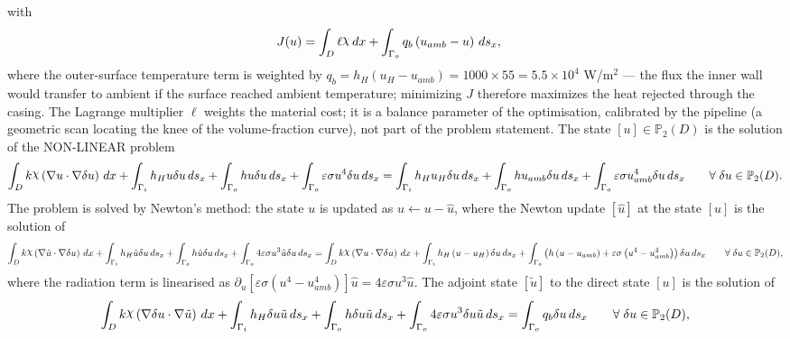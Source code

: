 \documentclass[preview]{standalone}
\let\oldcdot\cdot
\let\cdot\oldcdot
\begin{document}
with
\begin{align*}
J(u) &=  \int_{D} \ell \raisebox{\depth}{$\chi$} \,dx + \int_{\Gamma_o} q_b \left( u_{amb} - u\right) \,ds_x ,
 \end{align*}
where the outer-surface temperature term is weighted by $q_b = h_H \left( u_H - u_{amb}\right) = 1000 \times 55 = 5.5 \times 10^{4}$ W/m$^{2}$ — the flux the inner wall would transfer to ambient if the surface reached ambient temperature; minimizing $J$ therefore maximizes the heat rejected through the casing.  The Lagrange multiplier $\ell$ weights the material cost; it is a balance parameter of the optimisation, calibrated by the pipeline (a geometric scan locating the knee of the volume-fraction curve), not part of the problem statement.
The state $\left[ u\right] \in \mathbb P_{2}(D)$ is the solution of the NON-LINEAR problem
\begin{dmath*}
\int_{D} k \raisebox{\depth}{$\chi$} \left(  \nabla u  \cdot  \nabla \delta u  \right) \,dx + \int_{\Gamma_i} h_H u \delta u \,ds_x + \int_{\Gamma_o} h u \delta u \,ds_x + \int_{\Gamma_o} \varepsilon \sigma u^{4} \delta u \,ds_x = \int_{\Gamma_i} h_H u_{H} \delta u \,ds_x + \int_{\Gamma_o} h u_{amb} \delta u \,ds_x + \int_{\Gamma_o} \varepsilon \sigma u_{amb}^{4} \delta u \,ds_x \qquad \forall\; {\delta u\in \mathbb P_{2}(D)} .
\end{dmath*}
The problem is solved by Newton's method: the state $u$ is updated as $u \leftarrow u - \hat u$, where the Newton update $\left[ \hat u\right]$ at the state $\left[ u\right]$ is the solution of
\begin{dmath*}
\int_{D} k \raisebox{\depth}{$\chi$} \left(  \nabla \hat u  \cdot  \nabla \delta u  \right) \,dx + \int_{\Gamma_i} h_H \hat u \delta u \,ds_x + \int_{\Gamma_o} h \hat u \delta u \,ds_x + \int_{\Gamma_o} 4 \varepsilon \sigma u^{3} \hat u \delta u \,ds_x = \int_{D} k \raisebox{\depth}{$\chi$} \left(  \nabla u  \cdot  \nabla \delta u  \right) \,dx + \int_{\Gamma_i} h_H \left( u - u_H\right) \delta u \,ds_x + \int_{\Gamma_o} \left( h \left( u - u_{amb}\right) + \varepsilon \sigma \left( u^{4} - u_{amb}^{4}\right)\right) \delta u \,ds_x \qquad \forall\; {\delta u\in \mathbb P_{2}(D)} ,
\end{dmath*}
where the radiation term is linearised as $\partial_{u} \left[ \varepsilon \sigma \left( u^{4} - u_{amb}^{4}\right)\right] \hat u = 4 \varepsilon \sigma u^{3} \hat u$.
The adjoint state $\left[ \tilde u\right]$ to the direct state $\left[ u\right]$ is the solution of
\begin{dmath*}
\int_{D} k \raisebox{\depth}{$\chi$} \left(  \nabla \delta u  \cdot  \nabla \tilde u  \right) \,dx + \int_{\Gamma_i} h_H \delta u \tilde u \,ds_x + \int_{\Gamma_o} h \delta u \tilde u \,ds_x + \int_{\Gamma_o} 4 \varepsilon \sigma u^{3} \delta u \tilde u \,ds_x = \int_{\Gamma_o} q_b \delta u \,ds_x \qquad \forall\; {\delta u\in \mathbb P_{2}(D)} ,
\end{dmath*}
\end{document}
